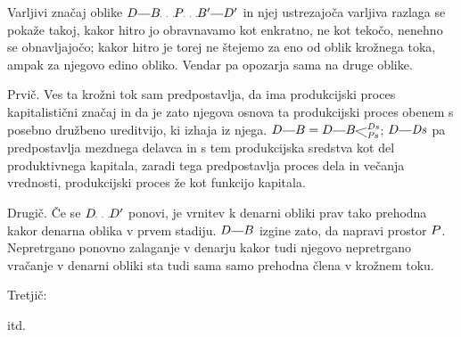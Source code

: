 \documentclass[kapital_02.tex]{subfiles}
\begin{document}
Varljivi značaj oblike \( \KPED \KPEcrta \KPEB \KPEpike \KPEP \KPEpike \KPEB' \KPEcrta \KPED' \) in njej ustrezajoča varljiva razlaga se pokaže takoj, kakor hitro jo obravnavamo kot enkratno, ne kot tekočo, nenehno se obnavljajočo; kakor hitro je torej ne štejemo za eno od oblik krožnega toka, ampak za njegovo edino obliko. Vendar pa opozarja sama na druge oblike.

Prvič. Ves ta krožni tok sam predpostavlja, da ima produkcijski proces kapitalistični značaj in da je zato njegova osnova ta produkcijski proces obenem s posebno družbeno ureditvijo, ki izhaja iz njega. \( \KPED \KPEcrta \KPEB = \KPED \KPEcrta \KPEBrazcepDsPs \); \( \KPED \KPEcrta \KPEDs \) pa predpostavlja mezdnega delavca in s tem produkcijska sredstva kot del produktivnega kapitala, zaradi tega predpostavlja proces dela in večanja vrednosti, produkcijski proces že kot funkcijo kapitala.

Drugič. Če se \( \KPED \KPEpike \KPED' \) ponovi, je vrnitev k denarni obliki prav tako prehodna kakor denarna oblika v prvem stadiju. \( \KPED \KPEcrta \KPEB \) izgine zato, da napravi prostor \( P \). Nepretrgano ponovno zalaganje v denarju kakor tudi njegovo nepretrgano vračanje v denarni obliki sta tudi sama samo prehodna člena v krožnem toku.

Tretjič: 
itd.
\end{document}
